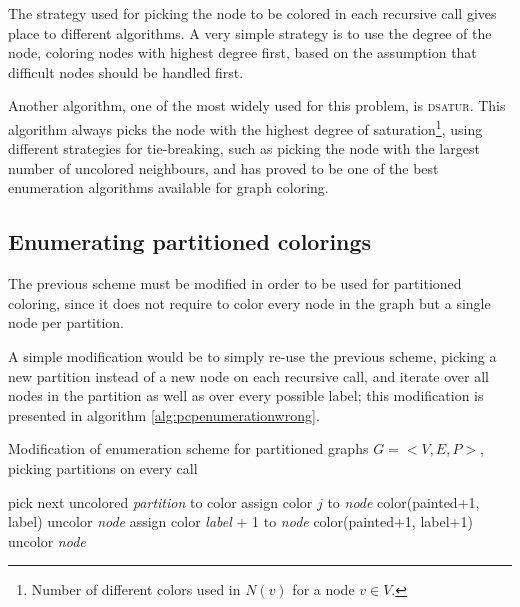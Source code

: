 The strategy used for picking the node to be colored in each recursive call gives place to different algorithms. A very simple strategy is to use the degree of the node, coloring nodes with highest degree first, based on the assumption that difficult nodes should be handled first.

Another algorithm, one of the most widely used for this problem, is \textsc{dsatur}\cite{brelaz1979new}. This algorithm always picks the node with the highest degree of saturation\footnote{Number of different colors used in $N(v)$ for a node $v \in V$.}, using different strategies for tie-breaking, such as picking the node with the largest number of uncolored neighbours\cite{sewell1996improved}, and has proved to be one of the best enumeration algorithms available for graph coloring.

\subsection{Enumerating partitioned colorings}

The previous scheme must be modified in order to be used for partitioned coloring, since it does not require to color every node in the graph but a single node per partition.

A simple modification would be to simply re-use the previous scheme, picking a new partition instead of a new node on each recursive call, and iterate over all nodes in the partition as well as over every possible label; this modification is presented in algorithm \ref{alg:pcpenumerationwrong}. 

\begin{algorithm}
\caption{Modification of enumeration scheme for partitioned graphs $G = <V,E,P>$, picking partitions on every call}
\label{alg:pcpenumerationwrong}

\begin{algorithmic}
		\STATE pick next uncolored \textit{partition} to color		
					\STATE assign color $j$ to \textit{node}
					\CALL color(painted+1, label)
					\STATE uncolor \textit{node}
				\ENDIF
			\ENDFOR
			\STATE assign color \textit{label} + 1 to \textit{node}
			\CALL color(painted+1, label+1)
			\STATE uncolor \textit{node}
		\ENDFOR
\end{algorithmic}
\end{algorithm}

